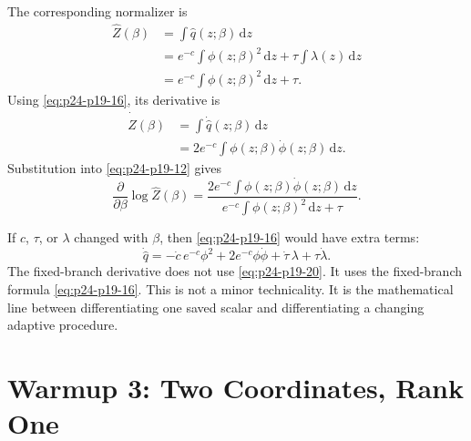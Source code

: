 \documentclass[11pt]{article}
\numberwithin{equation}{section}
\newcommand{\dd}{\,\mathrm d}
\begin{document}
The corresponding normalizer is
\begin{equation}
\begin{aligned}
    \widehat Z(\beta)
    &=
    \int \widehat q(z;\beta)\dd z\\
    &=
    e^{-c}\int \phi(z;\beta)^2\dd z
    +
    \tau\int\lambda(z)\dd z\\
    &=
    e^{-c}\int \phi(z;\beta)^2\dd z+\tau.
\end{aligned}
\label{eq:p24-p19-17}
\end{equation}
Using \eqref{eq:p24-p19-16}, its derivative is
\begin{equation}
\begin{aligned}
    \dot{\widehat Z}(\beta)
    &=
    \int \dot{\widehat q}(z;\beta)\dd z\\
    &=
    2e^{-c}
    \int \phi(z;\beta)\dot\phi(z;\beta)\dd z.
\end{aligned}
\label{eq:p24-p19-18}
\end{equation}
Substitution into \eqref{eq:p24-p19-12} gives
\begin{equation}
    \frac{\partial}{\partial\beta}\log\widehat Z(\beta)
    =
    \frac{
    2e^{-c}\int \phi(z;\beta)\dot\phi(z;\beta)\dd z}
    {e^{-c}\int\phi(z;\beta)^2\dd z+\tau}.
    \label{eq:p24-p19-19}
\end{equation}

If \(c\), \(\tau\), or \(\lambda\) changed with \(\beta\), then \eqref{eq:p24-p19-16} would have
extra terms:
\begin{equation}
    \dot{\widehat q}
    =
    -\dot c\,e^{-c}\phi^2
    +
    2e^{-c}\phi\dot\phi
    +
    \dot\tau\,\lambda
    +
    \tau\dot\lambda.
    \label{eq:p24-p19-20}
\end{equation}
The fixed-branch derivative does not use \eqref{eq:p24-p19-20}.  It uses the fixed-branch
formula \eqref{eq:p24-p19-16}.  This is not a minor technicality.  It is the mathematical line
between differentiating one saved scalar and differentiating a changing
adaptive procedure.

\section{Warmup 3: Two Coordinates, Rank One}
\end{document}
